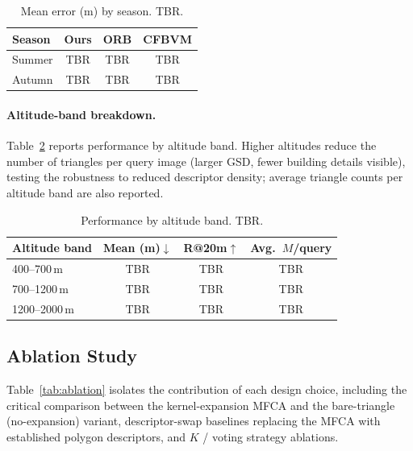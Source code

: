 \documentclass[10pt]{article}
\theoremstyle{plain}
\theoremstyle{definition}
\begin{document}
\begin{table}[htbp]
\caption{Mean error (m) by season. TBR.}
\label{tab:season}
\centering\small
\setlength{\tabcolsep}{5pt}
\begin{tabular}{lccc}
\toprule
\textbf{Season} & \textbf{Ours} & \textbf{ORB} & \textbf{CFBVM} \\
\midrule
Summer          & TBR & TBR & TBR \\
Autumn          & TBR & TBR & TBR \\
\bottomrule
\end{tabular}
\end{table}

\paragraph{Altitude-band breakdown.}
Table~\ref{tab:altitude} reports performance by altitude band.
Higher altitudes reduce the number of triangles per query image (larger GSD,
fewer building details visible), testing the robustness to reduced descriptor
density; average triangle counts per altitude band are also reported.

\begin{table}[htbp]
\caption{Performance by altitude band. TBR.}
\label{tab:altitude}
\centering\small
\setlength{\tabcolsep}{3.5pt}
\begin{tabular}{lccc}
\toprule
\textbf{Altitude band} & \textbf{Mean (m)$\downarrow$} & \textbf{R@20m$\uparrow$} & \textbf{Avg.\ $M$/query} \\
\midrule
400--700\,m   & TBR & TBR & TBR \\
700--1200\,m  & TBR & TBR & TBR \\
1200--2000\,m & TBR & TBR & TBR \\
\bottomrule
\end{tabular}
\end{table}

\subsection{Ablation Study}

Table~\ref{tab:ablation} isolates the contribution of each design choice,
including the critical comparison between the kernel-expansion MFCA and the
bare-triangle (no-expansion) variant, descriptor-swap baselines replacing the
MFCA with established polygon descriptors, and $K$ / voting strategy ablations.
\end{document}
